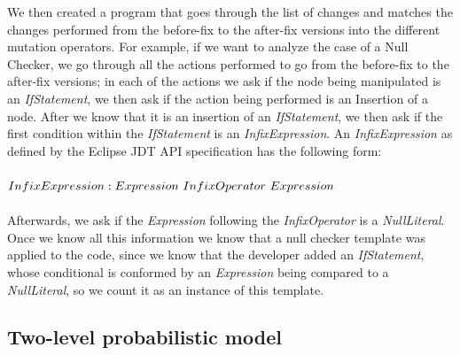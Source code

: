 \documentclass[conference]{IEEEtran}
\begin{document}
We then created a program that goes through the list of changes and matches the
changes performed from the before-fix to the after-fix versions into the
different mutation operators. For example, if we want to analyze the 
case of a Null Checker, we go through all the actions performed to go from the
before-fix to the after-fix versions; in each of the actions we ask if the node
being manipulated is an \emph{IfStatement}, we then  ask if the action being performed
is an Insertion of a node. After we know that it is an insertion of an \emph{IfStatement}, we then ask if the first condition within the \emph{IfStatement} is an
\emph{InfixExpression}. An \emph{InfixExpression} as defined by the Eclipse JDT API
specification has the following form: 
\\
\\
$InfixExpression: \\
Expression~InfixOperator~Expression
$
\\
\\  
Afterwards, we ask if the \emph{Expression} following the \emph{InfixOperator} is a
\emph{NullLiteral}. Once we know all this information we know that a null checker
template was applied to the code, since we know that the developer added an \emph{IfStatement}, whose conditional is conformed by an \emph{Expression} being compared to a
\emph{NullLiteral}, so we count it as an instance of this template. 







\subsection{Two-level probabilistic model}
\end{document}
